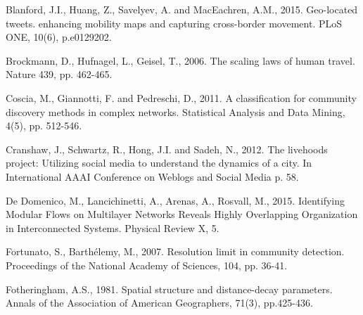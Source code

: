 \documentclass[]{tGIS2e}
\begin{document}



\begin{thebibliography}{9}

Blanford, J.I., Huang, Z., Savelyev, A. and MacEachren, A.M., 2015. Geo-located tweets. enhancing mobility maps and capturing cross-border movement. PLoS ONE, 10(6), p.e0129202.

Brockmann, D., Hufnagel, L., Geisel, T., 2006. The scaling laws of human travel. Nature 439, pp. 462-465.

Coscia, M., Giannotti, F. and Pedreschi, D., 2011. A classification for community discovery methods in complex networks. Statistical Analysis and Data Mining, 4(5), pp. 512-546.

Cranshaw, J., Schwartz, R., Hong, J.I. and Sadeh, N., 2012. The livehoods project: Utilizing social media to understand the dynamics of a city. In International AAAI Conference on Weblogs and Social Media p. 58.

De Domenico, M., Lancichinetti, A., Arenas, A., Rosvall, M., 2015. Identifying Modular Flows on Multilayer Networks Reveals Highly Overlapping Organization in Interconnected Systems. Physical Review X, 5.

Fortunato, S., Barthélemy, M., 2007. Resolution limit in community detection. Proceedings of the National Academy of Sciences, 104, pp. 36-41. 

Fotheringham, A.S., 1981. Spatial structure and distance-decay parameters. Annals of the Association of American Geographers, 71(3), pp.425-436.



\end{thebibliography}
\end{document}
